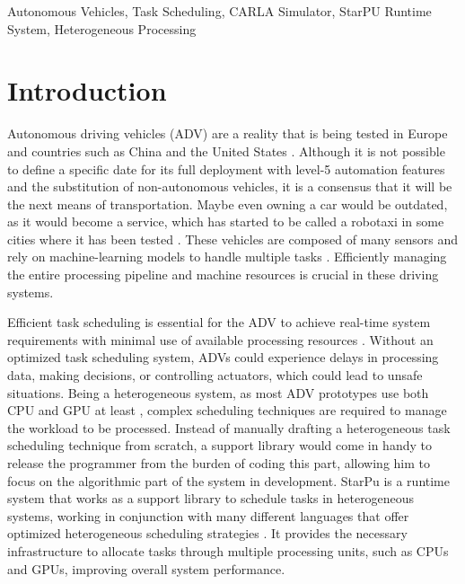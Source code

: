 \documentclass[conference]{IEEEtran}
\begin{document}

\begin{IEEEkeywords}
Autonomous Vehicles, Task Scheduling, CARLA Simulator, StarPU Runtime System, Heterogeneous Processing
\end{IEEEkeywords}

\section{Introduction}
Autonomous driving vehicles (ADV) are a reality that is being tested in Europe and countries such as China and the United States \cite{Silva2024}. Although it is not possible to define a specific date for its full deployment with level-5 automation features and the substitution of non-autonomous vehicles, it is a consensus that it will be the next means of transportation. %
Maybe even owning a car would be outdated, as it would become a service, which has started to be called a robotaxi in some cities where it has been tested \cite{kanbur2023}. These vehicles are composed of many sensors and rely on machine-learning models to handle multiple tasks \cite{icce24}. Efficiently managing the entire processing pipeline and machine resources is crucial in these driving systems. %

Efficient task scheduling is essential for the ADV to achieve real-time system requirements with minimal use of available processing resources \cite{amarnath2021}. Without an optimized task scheduling system, ADVs could experience delays in processing data, making decisions, or controlling actuators, which could lead to unsafe situations\cite{Balasekaran2021}. Being a heterogeneous system, as most ADV prototypes use both CPU and GPU at least \cite{Silva2024}, complex scheduling techniques are required to manage the workload to be processed. Instead of manually drafting a heterogeneous task scheduling technique from scratch, a support library would come in handy to release the programmer from the burden of coding this part, allowing him to focus on the algorithmic part of the system in development. StarPu is a runtime system that works as a support library to schedule tasks in heterogeneous systems, working in conjunction with many different languages that offer optimized heterogeneous scheduling strategies \cite{augonnet2009}. It provides the necessary infrastructure to allocate tasks through multiple processing units, such as CPUs and GPUs, improving overall system performance.
\end{document}
